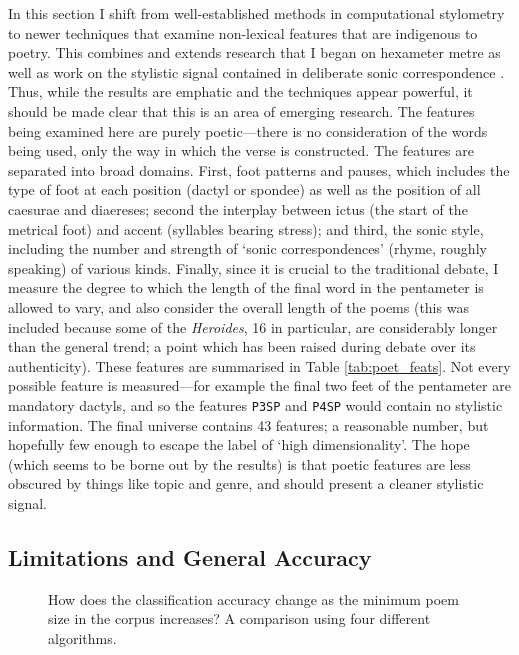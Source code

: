 \documentclass[twocolumn, switch, a4paper]{article} %
\begin{document}
In this section I shift from well-established methods in computational
stylometry to newer techniques that examine non-lexical features that are
indigenous to poetry. This combines and extends research that I began on
hexameter metre \cite{nagy2021metre} as well as work on the stylistic signal
contained in deliberate sonic correspondence \cite{nagy_rhyme_2022}. Thus,
while the results are emphatic and the techniques appear powerful, it should
be made clear that this is an area of emerging research. The features being
examined here are purely poetic---there is no consideration of the words being
used, only the way in which the verse is constructed. The features are
separated into broad domains. First, foot patterns and pauses, which includes
the type of foot at each position (dactyl or spondee) as well as the position
of all caesurae and diaereses; second the interplay between ictus (the start
of the metrical foot) and accent (syllables bearing stress); and third, the
sonic style, including the number and strength of `sonic correspondences'
(rhyme, roughly speaking) of various kinds. Finally, since it is crucial to
the traditional debate, I measure the degree to which the length of the final
word in the pentameter is allowed to vary, and also consider the overall
length of the poems (this was included because some of the \emph{Heroides}, 16
in particular, are considerably longer than the general trend; a point which
has been raised during debate over its authenticity). These features are
summarised in Table \ref{tab:poet_feats}. Not every possible feature is
measured---for example the final two feet of the pentameter are mandatory
dactyls, and so the features \texttt{P3SP} and \texttt{P4SP} would contain no
stylistic information. The final universe contains 43 features; a reasonable
number, but hopefully few enough to escape the label of `high dimensionality'.
The hope (which seems to be borne out by the results) is that poetic features
are less obscured by things like topic and genre, and should present a cleaner
stylistic signal.

\subsection{Limitations and General Accuracy}

\begin{figure*}
  \caption{How does the classification accuracy change as the minimum poem
  size in the corpus increases? A comparison using four different algorithms.}
  \label{fig:poetics_acc}
  \centering
  \qquad
\end{figure*}
\end{document}
